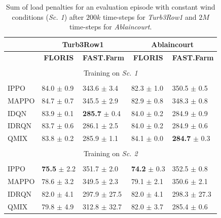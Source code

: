 \documentclass{article}
\newcommand{\ra}[1]
{\renewcommand{\arraystretch}{#1}}
\begin{document}
\begin{table}[!htb]
\ra{1.2}
\centering
\begin{tabular}{lllll}
 & \multicolumn{2}{c}{\textbf{Turb3Row1}} & \multicolumn{2}{c}{\textbf{Ablaincourt}} \\
\hline
 & \multicolumn{1}{c}{\textbf{FLORIS}} & \textbf{FAST.Farm}& \multicolumn{1}{c}{\textbf{FLORIS}} & \textbf{FAST.Farm}\\
 \hline
& & & & \\
\multicolumn{5}{c}{Training on \textit{Sc. 1}} \\
& & & & \\
IPPO & 84.0 $\pm$ 0.9 & 343.6 $\pm$ 3.4 & 82.3 $\pm$ 1.0 & 350.5 $\pm$ 0.5 \\
MAPPO & 84.7 $\pm$ 0.7 & 345.5 $\pm$ 2.9 & 82.9 $\pm$ 0.8 & 348.3 $\pm$ 0.8 \\
IDQN & 83.9 $\pm$ 0.1 & \textbf{285.7} $\pm$ 0.4 & 84.0 $\pm$ 0.2 & 284.9 $\pm$ 0.9 \\
IDRQN & 83.7 $\pm$ 0.6 & 286.1 $\pm$ 2.5 & 84.0 $\pm$ 0.2 & 284.9 $\pm$ 0.6 \\
QMIX & 83.8 $\pm$ 0.2 & 285.9 $\pm$ 1.1 & 84.1 $\pm$ 0.0 & \textbf{284.7} $\pm$ 0.3 \\
\hline
& & & &  \\
\multicolumn{5}{c}{Training on \textit{Sc. 2}} \\
& & & & \\
IPPO & \textbf{75.5} $\pm$ 2.2 & 351.7 $\pm$ 2.0 & \textbf{74.2} $\pm$ 0.3 & 352.5 $\pm$ 0.8 \\
MAPPO & 78.6 $\pm$ 3.2 & 349.5 $\pm$ 2.3 & 79.1 $\pm$ 2.1 & 350.6 $\pm$ 2.1 \\
IDRQN & 82.0 $\pm$ 4.1 & 297.9 $\pm$ 27.5 & 82.0 $\pm$ 4.1 & 298.3 $\pm$ 27.3 \\
QMIX & 79.8 $\pm$ 4.9 & 312.8 $\pm$ 32.7 & 82.0 $\pm$ 3.7 & 285.4 $\pm$ 0.6
\end{tabular}
\caption{Sum of load penalties for an evaluation episode with constant wind conditions (\textit{Sc. 1}) after $200k$ time-steps for \textit{Turb3Row1} and $2M$ time-steps for \textit{Ablaincourt}.} \label{tab:train_loads}
\end{table}
\end{document}

